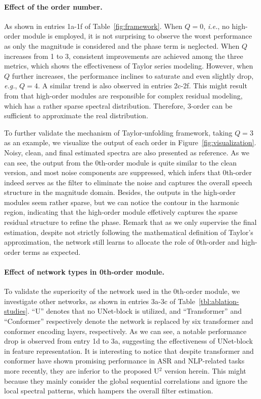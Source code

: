\documentclass{article}
\begin{document}
{\paragraph{Effect of the order number.} As shown in entries 1a-1f of Table~{\ref{fig:framework}}. When $Q = 0$, \emph{i.e.}, no high-order module is employed, it is not surprising to observe the worst performance as only the magnitude is considered and the phase term is neglected. When $Q$ increases from 1 to 3, consistent improvements are achieved among the three metrics, which shows the effectiveness of Taylor series modeling. However, when $Q$ further increases, the performance inclines to saturate and even slightly drop, \emph{e.g.}, $Q = 4$. A similar trend is also observed in entries 2c-2f. This might result from that high-order modules are responsible for complex residual modeling, which has a rather sparse spectral distribution. Therefore, 3-order can be sufficient to approximate the real distribution.

To further validate the mechanism of Taylor-unfolding framework, taking $Q = 3$ as an example, we visualize the output of each order in Figure~{\ref{fig:visualization}}. Noisy, clean, and final estimated spectra are also presented as reference. As we can see, the output from the 0th-order module is quite similar to the clean version, and most noise components are suppressed, which infers that 0th-order indeed serves as the filter to eliminate the noise and captures the overall speech structure in the magnitude domain. Besides, the outputs in the high-order modules seem rather sparse, but we can notice the contour in the harmonic region, indicating that the high-order module effetively captures the sparse residual structure to refine the phase. Remark that as we only supervise the final estimation, despite not strictly following the mathematical definition of Taylor's approximation, the network still learns to allocate the role of 0th-order and high-order terms as expected.

\paragraph{Effect of network types in 0th-order module.} To validate the superiority of the network used in the 0th-order module, we investigate other networks, as shown in entries 3a-3c of Table~{\ref{tbl:ablation-studies}}. ``U'' denotes that no UNet-block is utilized, and ``Transformer'' and ``Conformer'' respectively denote the network is replaced by six transformer and conformer encoding layers, respectively. As we can see, a notable performance drop is observed from entry 1d to 3a, suggesting the effectiveness of UNet-block in feature representation. It is interesting to notice that despite transformer and conformer have shown promising performance in ASR and NLP-related tasks more recently, they are inferior to the proposed U$^{2}$ version herein. This might because they mainly consider the global sequential correlations and ignore the local spectral patterns, which hampers the overall filter estimation. 
\vspace{-0.2cm}
}
\end{document}
